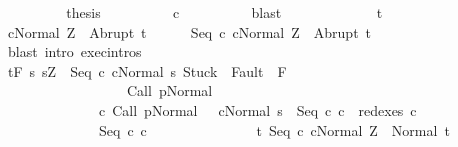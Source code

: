 \begin{isabellebody}
\ \ \ \ \ \ \isamarkupfalse%
\ \isamarkupfalse%
\ {\isacharquery}thesis\isanewline
\ \ \ \ \ \ \ \ \isamarkupfalse%
\ c{}\isanewline
\ \ \ \ \ \ \ \ \isamarkupfalse%
\ blast\isanewline
\ \ \ \ \isamarkupfalse%
\isanewline
\ \ \isamarkupfalse%
\isanewline
\ \ \ \ \isamarkupfalse%
\ t\ \isanewline
\ \ \ \ \isamarkupfalse%
\ {\isachardoublequoteopen}{\isasymGamma}{\isasymturnstile}{\isasymlangle}c{}{\isacharcomma}Normal\ Z{\isasymrangle}\ {\isasymRightarrow}\ Abrupt\ t{\isachardoublequoteclose}\isanewline
\ \ \ \ \isamarkupfalse%
\ {\isachardoublequoteopen}{\isasymGamma}{\isasymturnstile}{\isasymlangle}Seq\ c{}\ c{}{\isacharcomma}Normal\ Z{\isasymrangle}\ {\isasymRightarrow}\ Abrupt\ t{\isachardoublequoteclose}\isanewline
\ \ \ \ \ \ \isamarkupfalse%
\ {\isacharparenleft}blast\ intro{\isacharcolon}\ exec{\isachardot}intros{\isacharparenright}\isanewline
\ \ \isamarkupfalse%
\isanewline
\ \ \isamarkupfalse%
\ {\isachardoublequoteopen}{\isasymGamma}{\isacharcomma}{\isasymTheta}{\isasymturnstile}\isactrlsub t\isactrlbsub {\isacharslash}F\isactrlesub \ {\isacharbraceleft}s{\isachardot}\ s{\isacharequal}Z\ {\isasymand}\ {\isasymGamma}{\isasymturnstile}{\isasymlangle}Seq\ c{}\ c{}{\isacharcomma}Normal\ s{\isasymrangle}\ {\isasymRightarrow}{\isasymnotin}{\isacharparenleft}{\isacharbraceleft}Stuck{\isacharbraceright}\ {\isasymunion}\ Fault\ {\isacharbackquote}\ {\isacharparenleft}{\isacharminus}F{\isacharparenright}{\isacharparenright}\ {\isasymand}\ \ \ \ \ \isanewline
\ \ \ \ \ \ \ \ \ \ \ \ \ \ \ \ \ \ {\isasymGamma}{\isasymturnstile}Call\ p{\isasymdown}Normal\ {\isasymsigma}\ {\isasymand}\isanewline
\ \ \ \ \ \ \ \ \ \ \ \ \ \ {\isacharparenleft}{\isasymexists}c{\isacharprime}{\isachardot}\ {\isasymGamma}{\isasymturnstile}{\isacharparenleft}Call\ p{\isacharcomma}Normal\ {\isasymsigma}{\isacharparenright}\ {\isasymrightarrow}\isactrlsup {\isacharplus}\ {\isacharparenleft}c{\isacharprime}{\isacharcomma}Normal\ s{\isacharparenright}\ {\isasymand}\ Seq\ c{}\ c{}\ {\isasymin}\ redexes\ c{\isacharprime}{\isacharparenright}{\isacharbraceright}\isanewline
\ \ \ \ \ \ \ \ \ \ \ \ \ \ Seq\ c{}\ c{}\ \isanewline
\ \ \ \ \ \ \ \ \ \ \ \ \ \ {\isacharbraceleft}t{\isachardot}\ {\isasymGamma}{\isasymturnstile}{\isasymlangle}Seq\ c{}\ c{}{\isacharcomma}Normal\ Z{\isasymrangle}\ {\isasymRightarrow}\ Normal\ t{\isacharbraceright}{\isacharcomma}\isanewline

\end{isabellebody}
